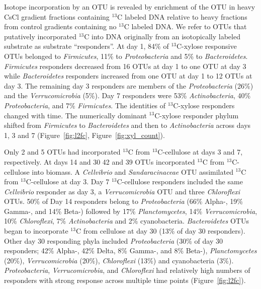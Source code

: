 Isotope incorporation by an OTU is revealed by enrichment of the OTU in heavy
CsCl gradient fractions containing $^{13}$C labeled DNA relative to heavy
fractions from control gradients containing no $^{13}$C labeled DNA. We refer
to OTUs that putatively incorporated $^{13}$C into DNA originally from an
isotopically labeled substrate as  substrate ``responders''. At day 1, 84\% of
$^{13}$C-xylose responsive OTUs belonged to \textit{Firmicutes}, 11\% to
\textit{Proteobacteria} and 5\% to \textit{Bacteroidetes}. \textit{Firmicutes}
responders decreased from 16 OTUs at day 1 to one OTU at day 3 while
\textit{Bacteroidetes} responders increased from one OTU at day 1 to 12 OTUs at
day 3. The remaining day 3 responders are members of the
\textit{Proteobacteria} (26\%) and the \textit{Verrucomicrobia} (5\%). Day
7 responders were 53\% \textit{Actinobacteria}, 40\% \textit{Proteobacteria},
and 7\% \textit{Firmicutes}. The identities of $^{13}$C-xylose responders
changed with time. The numerically dominant $^{13}$C-xylose responder phylum
shifted from \textit{Firmicutes} to \textit{Bacteroidetes} and then to
\textit{Actinobacteria} across days 1, 3 and 7 (Figure~\ref{fig:l2fc},
Figure~\ref{fig:xyl_count}). 

Only 2 and 5 OTUs had incorporated $^{13}$C from
$^{13}$C-cellulose at days 3 and 7, respectively. At days 14 and 30
42 and 39 OTUs incorporated $^{13}$C from $^{13}$C-cellulose into
biomass. A \textit{Cellvibrio} and \textit{Sandaracinaceae} OTU assimilated
$^{13}$C from $^{13}$C-cellulose at day 3. Day 7 $^{13}$C-cellulose responders
included the same \textit{Cellvibrio} responder as day 3,
a \textit{Verrucomicrobia} OTU and three \textit{Chloroflexi} OTUs.  50\% of
Day 14 responders belong to \textit{Proteobacteria} (66\% Alpha-, 19\% Gamma-,
and 14\% Beta-) followed by 17\% \textit{Planctomycetes}, 14\%
\textit{Verrucomicrobia}, 10\% \textit{Chloroflexi}, 7\%
\textit{Actinobacteria} and 2\% cyanobacteria. \textit{Bacteroidetes} OTUs
began to incorporate $^{13}$C from cellulose at day
30 (13\% of day 30 responders). Other day 30 responding phyla included
\textit{Proteobacteria} (30\% of day 30 responders; 42\% Alpha-, 42\% Delta,
8\% Gamma-, and 8\% Beta-), \textit{Planctomycetes} (20\%),
\textit{Verrucomicrobia} (20\%), \textit{Chloroflexi} (13\%) and
cyanobacteria (3\%). \textit{Proteobacteria}, \textit{Verrucomicrobia}, and
\textit{Chloroflexi} had relatively high numbers of responders with strong
response across multiple time points (Figure~\ref{fig:l2fc}).

